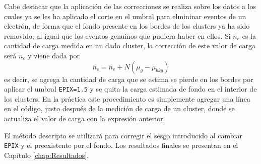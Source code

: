 Cabe destacar que la aplicación de las correcciones se realiza sobre los datos a los cuales ya se les ha aplicado el corte en el umbral para elmininar eventos de un electrón, de forma que el fondo presente en los bordes de los clusters ya ha sido removido, al igual que los eventos genuinos que pudiera haber en ellos. Si $n_{e}$ es la cantidad de carga medida en un dado cluster, la corrección de este valor de carga será $n_{c}$ y viene dada por
\begin{equation*}
    n_{c} = n_{e} + N(\mu_{g} - \mu_{bkg})
\end{equation*}
es decir, se agrega la cantidad de carga que se estima se pierde en los bordes por aplicar el umbral \verb|EPIX=1.5| y se quita la carga estimada de fondo en el interior de los clusters. En la práctica este procedimiento es simplemente agregar una línea en el código, justo después de la medición de carga de un cluster, donde se actualiza el valor de carga con la expresión anterior.

El método descripto se utilizará para corregir el sesgo introducido al cambiar \verb|EPIX| y el preexistente por el fondo. Los resultados finales se presentan en el Capítulo \ref{chap:Resultados}.